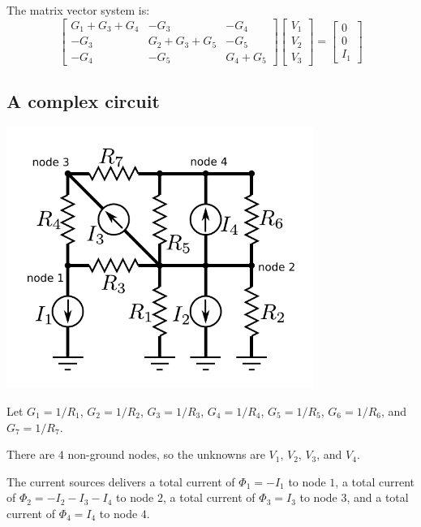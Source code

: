 \documentclass{article}
\begin{document}
The matrix vector system is:
\[\begin{bmatrix} G_1 + G_3 + G_4 & -G_3 & -G_4 \\ -G_3 & G_2 + G_3 + G_5 & -G_5 \\ -G_4 & -G_5 & G_4 + G_5 \end{bmatrix}
\begin{bmatrix} V_1 \\ V_2 \\ V_3 \end{bmatrix} = 
\begin{bmatrix} 0 \\ 0 \\ I_1 \end{bmatrix}\]



\subsection{A complex circuit}


\parbox{0.75\textwidth}{
\includegraphics[width = 0.75\textwidth]{complex_circuit_3}
} 

Let \(G_1 = 1/R_1\), \(G_2 = 1/R_2\), \(G_3 = 1/R_3\), \(G_4 = 1/R_4\), \(G_5 = 1/R_5\), \(G_6 = 1/R_6\), and \(G_7 = 1/R_7\).           

There are \(4\) non-ground nodes, so the unknowns are \(V_1\), \(V_2\), \(V_3\), and \(V_4\). 

The current sources delivers a total current of \(\Phi_1 = -I_1\) to node \(1\), a total current of \(\Phi_2 = - I_2 - I_3 - I_4\) to node \(2\), a total current of \(\Phi_3 = I_3\) to node \(3\), and a total current of \(\Phi_4 = I_4\) to node \(4\).
\end{document}
